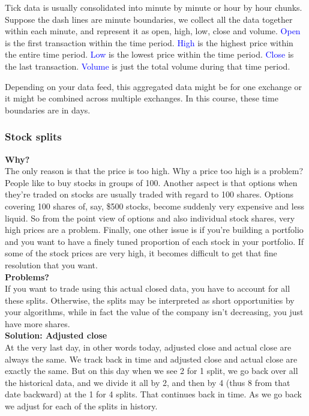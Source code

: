 \documentclass[12pt]{article}
\begin{document}
Tick data is usually consolidated into minute by minute or hour by hour chunks. Suppose the dash lines are minute boundaries, we collect all the data together within each minute, and represent it as open, high, low, close and volume. \textcolor{blue}{Open} is the first transaction within the time period. \textcolor{blue}{High} is the highest price within the entire time period. \textcolor{blue}{Low} is the lowest price within the time period. \textcolor{blue}{Close} is the last transaction. \textcolor{blue}{Volume} is just the total volume during that time period. 

Depending on your data feed, this aggregated data might be for one exchange or it might be combined across multiple exchanges. In this course, these time boundaries are in days. 

\subsubsection{Stock splits}

\textbf{Why?} \\ 
The only reason is that the price is too high. Why a price too high is a problem? People like to buy stocks in groups of 100. Another aspect is that options when they're traded on stocks are usually traded with regard to 100 shares. Options covering 100 shares of, say, \$500 stocks, become suddenly very expensive and less liquid. So from the point view of options and also individual stock shares, very high prices are a problem. Finally, one other issue is if you're building a portfolio and you want to have a finely tuned proportion of each stock in your portfolio. If some of the stock prices are very high, it becomes difficult to get that fine resolution that you want. \\[8pt]
\noindent
\textbf{Problems?} \\
If you want to trade using this actual closed data, you have to account for all these splits. Otherwise, the splits may be interpreted as short opportunities by your algorithms, while in fact the value of the company isn't decreasing, you just have more shares. \\[8pt]
\noindent
\textbf{Solution: Adjusted close} \\
At the very last day, in other words today, adjusted close and actual close are always the same. We track back in time and adjusted close and actual close are exactly the same. But on this day when we see 2 for 1 split, we go back over all the historical data, and we divide it all by 2, and then by 4 (thus 8 from that date backward) at the 1 for 4 splits. That continues back in time. As we go back we adjust for each of the splits in  history. 
\end{document}
